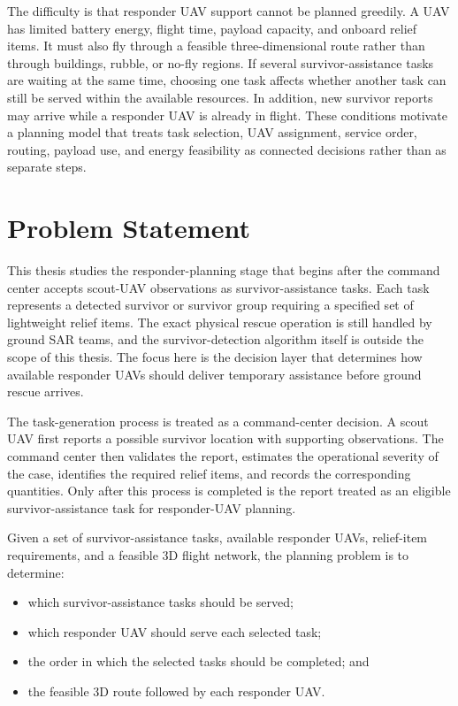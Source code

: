 The difficulty is that responder UAV support cannot be planned greedily. A UAV
has limited battery energy, flight time, payload capacity, and onboard relief
items. It must also fly through a feasible three-dimensional route rather than
through buildings, rubble, or no-fly regions. If several survivor-assistance
tasks are waiting at the same time, choosing one task affects whether another
task can still be served within the available resources. In addition, new
survivor reports may arrive while a responder UAV is already in flight. These
conditions motivate a planning model that treats task selection, UAV
assignment, service order, routing, payload use, and energy feasibility as
connected decisions rather than as separate steps.

\section{Problem Statement}

This thesis studies the responder-planning stage that begins after the command
center accepts scout-UAV observations as survivor-assistance tasks. Each task
represents a detected survivor or survivor group requiring a specified set of
lightweight relief items. The exact physical rescue operation is still handled
by ground SAR teams, and the survivor-detection algorithm itself is outside the
scope of this thesis. The focus here is the decision layer that determines how
available responder UAVs should deliver temporary assistance before ground
rescue arrives.

The task-generation process is treated as a command-center decision. A scout
UAV first reports a possible survivor location with supporting observations.
The command center then validates the report, estimates the operational
severity of the case, identifies the required relief items, and records the
corresponding quantities. Only after this process is completed is the report
treated as an eligible survivor-assistance task for responder-UAV planning.

Given a set of survivor-assistance tasks, available responder UAVs, relief-item
requirements, and a feasible 3D flight network, the planning problem is to
determine:

\begin{itemize}
    \item which survivor-assistance tasks should be served;
    \item which responder UAV should serve each selected task;
    \item the order in which the selected tasks should be completed; and
    \item the feasible 3D route followed by each responder UAV.
\end{itemize}


